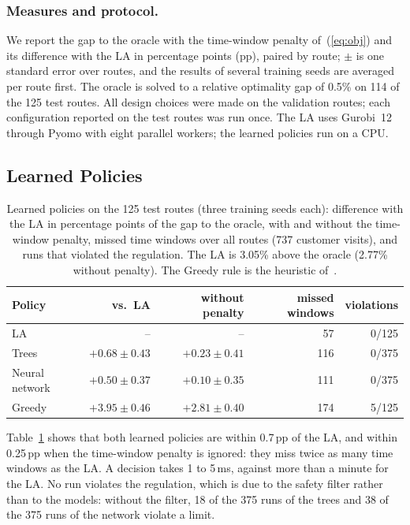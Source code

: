 \documentclass[runningheads]{llncs}
\begin{document}
\subsubsection{Measures and protocol.}
We report the gap to the oracle with the time-window penalty
of~(\ref{eq:obj}) and its difference with the LA in percentage points (pp),
paired by route; $\pm$ is one standard error over routes, and the results of
several training seeds are averaged per route first. The oracle is solved to a
relative optimality gap of 0.5\% on 114 of the 125 test routes. All design
choices were made on the validation routes; each configuration reported on the
test routes was run once. The LA uses Gurobi~12 through Pyomo with eight
parallel workers; the learned policies run on a CPU.

\subsection{Learned Policies}
\label{sec:learned}

\begin{table}[t]
\caption{Learned policies on the 125 test routes (three training seeds each):
difference with the LA in percentage points of the gap to the oracle, with and
without the time-window penalty, missed time windows over all routes (737
customer visits), and runs that violated the regulation. The LA is 3.05\%
above the oracle (2.77\% without penalty). The Greedy rule is the heuristic
of~\cite{pagnier_bakker_journal}.}
\label{tab:learned}
\centering
\begin{tabular}{lrrrr}
\toprule
Policy & vs.\ LA & without penalty & missed windows & violations\\
\midrule
LA & -- & -- & 57 & 0/125\\
Trees & $+0.68\pm0.43$ & $+0.23\pm0.41$ & 116 & 0/375\\
Neural network & $+0.50\pm0.37$ & $+0.10\pm0.35$ & 111 & 0/375\\
Greedy & $+3.95\pm0.46$ & $+2.81\pm0.40$ & 174 & 5/125\\
\bottomrule
\end{tabular}
\end{table}

Table~\ref{tab:learned} shows that both learned policies are within 0.7\,pp of
the LA, and within 0.25\,pp when the time-window penalty is ignored: they miss
twice as many time windows as the LA. A decision takes 1 to 5\,ms, against more
than a minute for the LA. No run violates the regulation, which is due to the
safety filter rather than to the models: without the filter, 18 of the 375
runs of the trees and 38 of the 375 runs of the network violate a limit.
\end{document}
